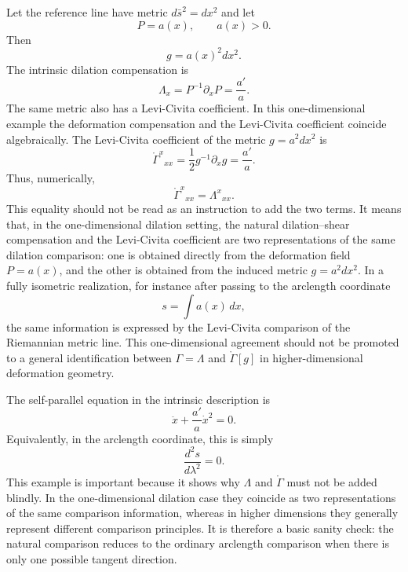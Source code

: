\documentclass[12pt]{amsart}
\theoremstyle{definition}
\theoremstyle{remark}
\begin{document}
Let the reference line have metric \(d\bar s^2=dx^2\) and let
\begin{equation}
 P=a(x),\qquad a(x)>0 .
\end{equation}
Then
\begin{equation}
 g=a(x)^2dx^2 .
\end{equation}
The intrinsic dilation compensation is
\begin{equation}\label{eq:one_dim_Lambda}
 \Lambda_x=P^{-1}\partial_xP=\frac{a'}{a} .
\end{equation}
The same metric also has a Levi-Civita coefficient.  In this one-dimensional example the deformation compensation and the Levi-Civita coefficient coincide algebraically.  The Levi-Civita coefficient of the metric \(g=a^2dx^2\) is
\begin{equation}\label{eq:one_dim_LC}
 \mathring\Gamma^x{}_{xx}
 =\frac12g^{-1}\partial_xg
 =\frac{a'}{a} .
\end{equation}
Thus, numerically,
\begin{equation}\label{eq:one_dim_equality}
 \mathring\Gamma^x{}_{xx}=\Lambda^x{}_{xx} .
\end{equation}
This equality should not be read as an instruction to add the two terms.  It means that, in the one-dimensional dilation setting, the natural dilation--shear compensation and the Levi-Civita coefficient are two representations of the same dilation comparison: one is obtained directly from the deformation field \(P=a(x)\), and the other is obtained from the induced metric \(g=a^2dx^2\).  In a fully isometric realization, for instance after passing to the arclength coordinate
\begin{equation}
 s=\int a(x)\,dx,
\end{equation}
the same information is expressed by the Levi-Civita comparison of the Riemannian metric line.  This one-dimensional agreement should not be promoted to a general identification between \(\Gamma=\Lambda\) and \(\mathring\Gamma[g]\) in higher-dimensional deformation geometry.

The self-parallel equation in the intrinsic description is
\begin{equation}
 \ddot x+\frac{a'}{a}\dot x^2=0 .
\end{equation}
Equivalently, in the arclength coordinate, this is simply
\begin{equation}
 \frac{d^2s}{d\lambda^2}=0 .
\end{equation}
This example is important because it shows why \(\Lambda\) and \(\mathring\Gamma\) must not be added blindly.  In the one-dimensional dilation case they coincide as two representations of the same comparison information, whereas in higher dimensions they generally represent different comparison principles.  It is therefore a basic sanity check: the natural comparison reduces to the ordinary arclength comparison when there is only one possible tangent direction.
\end{document}
